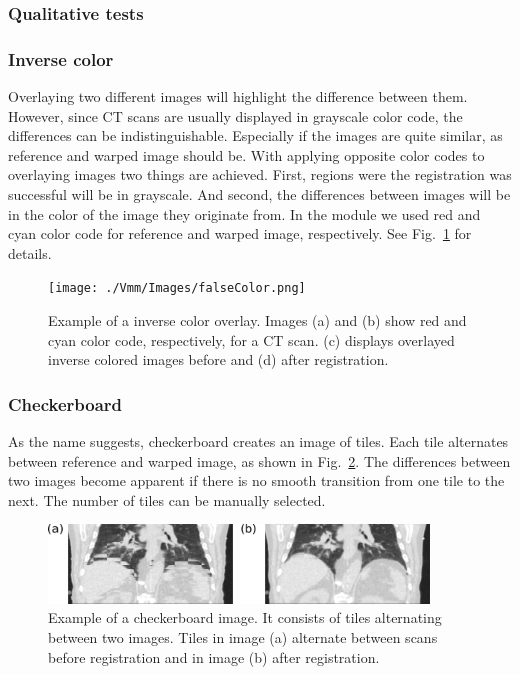 \subsubsection{Qualitative tests}

\subsubsection{Inverse color}


Overlaying two different images will highlight the difference between them. However, since CT scans are usually displayed in grayscale color code, the differences can be indistinguishable. Especially if the images are quite similar, as reference and warped image should be. With applying opposite color codes to overlaying images two things are achieved. First, regions were the registration was successful will be in grayscale. And second, the differences between images will be in the color of the image they originate from. In the module we used red and cyan color code for reference and warped image, respectively. See Fig.~\ref{falseColor} for details.

\newpage
\begin{figure}[H]
	\begin{center}		
		\texttt{[image: ./Vmm/Images/falseColor.png]}
		\caption{Example of a inverse color overlay. Images (a) and (b) show red and cyan color code, respectively, for a CT scan. (c) displays overlayed inverse colored images before and (d) after registration.}
		\label{falseColor}
	\end{center}
\end{figure}

\subsubsection{Checkerboard}

As the name suggests, checkerboard creates an image of tiles. Each tile alternates between reference and warped image, as shown in Fig.~\ref{checkerboard}. The differences between two images become apparent if there is no smooth transition from one tile to the next. 
The number of tiles can be manually selected.

\begin{figure}[H]
	\begin{center}		
		\includegraphics[width=0.9\textwidth]{./Vmm/Images/checkerboard.png}
		\caption{Example of a checkerboard image. It consists of tiles alternating between two images. Tiles in image (a) alternate between scans before registration and in image (b) after registration.}
		\label{checkerboard}
	\end{center}
\end{figure}

